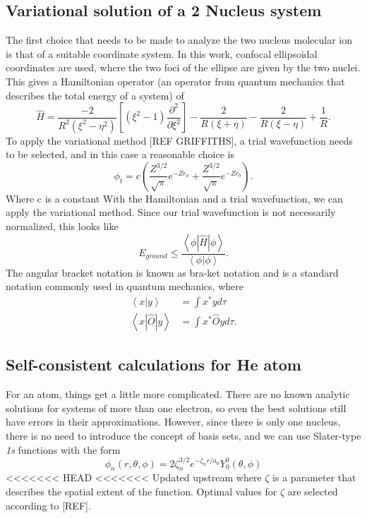\documentclass[journal=jacsat,manuscript=communication]{achemso}
\begin{document}
\subsection{Variational solution of a 2 Nucleus system}
The first choice that needs to be made to analyze the two nucleus  molecular ion is that of a suitable coordinate system.  In this work, confocal ellipsoidal coordinates are used, where the two foci of the ellipse are given by the two nuclei.  This gives a Hamiltonian operator (an operator from quantum mechanics that describes the total energy of a system) of
\begin{equation}
	\hat{H} = \frac{-2}{R^2\left(\xi^2-\eta^2\right)}\left[\left(\xi^2-1\right)\frac{\partial^2 }{\partial\xi^2}\right]-\frac{2}{R(\xi+\eta)}-\frac{2}{R(\xi-\eta)}+\frac{1}{R}.
\end{equation}
To apply the variational method [REF GRIFFITHS], a trial wavefunction needs to be selected, and in this case a reasonable choice is
\begin{equation}
	\phi_t = c\left(\frac{Z^{3/2}}{\sqrt{\pi}}e^{-Zr_a} + \frac{Z^{3/2}}{\sqrt{\pi}}e^{-Zr_b}\right).
\end{equation}
Where c is a constant
With the Hamiltonian and a trial wavefunction, we can apply the variational method.  Since our trial wavefunction is not necessarily normalized, this looks like
\begin{equation}
E_{ground} \leq \frac{\left<\phi | \hat{H} | \phi \right>}{\left<\phi|\phi\right>}.
\end{equation} 
The angular bracket notation is known as bra-ket notation and is a standard notation commonly used in quantum mechanics, where
\begin{align}
	\left<x|y\right> &= \int x^* y d\tau \\
	\left<x|\hat{O}|y\right> &= \int x^* \hat{O}yd\tau.
\end{align}
\subsection{Self-consistent calculations for He atom}
For an  atom, things get a little more complicated.  There are no known analytic solutions for systems of more than one electron, so even the best solutions still have errors in their approximations.  However, since there is only one nucleus, there is no need to introduce the concept of basis sets, and we can use Slater-type \textit{1s} functions with the form 
\begin{equation}
	\phi_n(r,\theta,\phi) = 2\zeta_n^{3/2}e^{-\zeta_nr/a_0}Y_0^0(\theta,\phi)
\end{equation}
<<<<<<< HEAD
<<<<<<< Updated upstream
where $\zeta$ is a parameter that describes the spatial extent of the function.  Optimal values for $\zeta$ are selected according to [REF].
\end{document}
